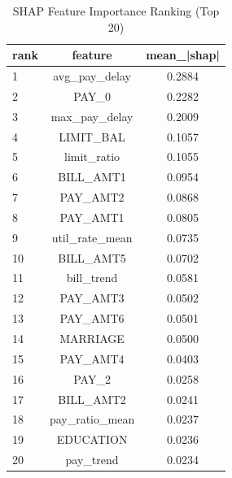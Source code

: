 \begin{table}
\centering
\caption{SHAP Feature Importance Ranking (Top 20)}
\label{tab:shap_ranking}
\begin{tabular}{lcc}
\toprule
rank & feature & mean_|shap| \\
\midrule
1 & avg_pay_delay & 0.2884 \\
2 & PAY_0 & 0.2282 \\
3 & max_pay_delay & 0.2009 \\
4 & LIMIT_BAL & 0.1057 \\
5 & limit_ratio & 0.1055 \\
6 & BILL_AMT1 & 0.0954 \\
7 & PAY_AMT2 & 0.0868 \\
8 & PAY_AMT1 & 0.0805 \\
9 & util_rate_mean & 0.0735 \\
10 & BILL_AMT5 & 0.0702 \\
11 & bill_trend & 0.0581 \\
12 & PAY_AMT3 & 0.0502 \\
13 & PAY_AMT6 & 0.0501 \\
14 & MARRIAGE & 0.0500 \\
15 & PAY_AMT4 & 0.0403 \\
16 & PAY_2 & 0.0258 \\
17 & BILL_AMT2 & 0.0241 \\
18 & pay_ratio_mean & 0.0237 \\
19 & EDUCATION & 0.0236 \\
20 & pay_trend & 0.0234 \\
\bottomrule
\end{tabular}
\end{table}
